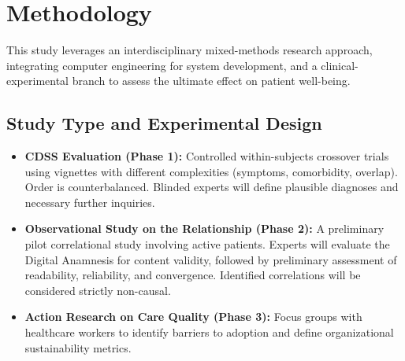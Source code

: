 \documentclass[11pt,a4paper]{article}
\begin{document}
\section{Methodology}

This study leverages an interdisciplinary mixed-methods research approach, integrating computer engineering for system development, and a clinical-experimental branch to assess the ultimate effect on patient well-being.

\subsection{Study Type and Experimental Design}

\begin{itemize}
    \item \textbf{CDSS Evaluation (Phase 1):} Controlled within-subjects crossover trials using vignettes with different complexities (symptoms, comorbidity, overlap). Order is counterbalanced. Blinded experts will define plausible diagnoses and necessary further inquiries.
    \item \textbf{Observational Study on the Relationship (Phase 2):} A preliminary pilot correlational study involving active patients. Experts will evaluate the Digital Anamnesis for content validity, followed by preliminary assessment of readability, reliability, and convergence. Identified correlations will be considered strictly non-causal.
    \item \textbf{Action Research on Care Quality (Phase 3):} Focus groups with healthcare workers to identify barriers to adoption and define organizational sustainability metrics.
\end{itemize}
\end{document}
